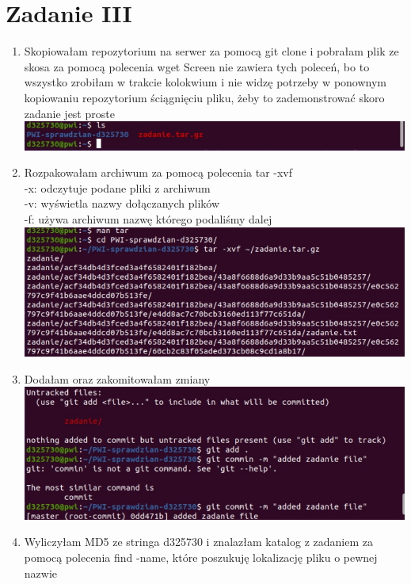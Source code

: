 \documentclass[12pt]{article}
\begin{document}
\section*{Zadanie III}
\begin{enumerate}
    \item Skopiowałam repozytorium na serwer za pomocą git clone i pobrałam plik ze skosa za pomocą polecenia wget
    Screen nie zawiera tych poleceń, bo to wszystko zrobiłam w trakcie kolokwium i nie widzę potrzeby w ponownym kopiowaniu repozytorium ściągnięciu pliku, żeby to zademonstrować skoro zadanie jest proste\\
    
    \includegraphics[scale = 0.9]{5.jpg}
    \newpage
    \item Rozpakowałam archiwum za pomocą polecenia tar -xvf \\
    -x: odczytuje podane pliki z archiwum\\
    -v: wyświetla nazwy dołączanych plików \\
    -f: używa archiwum nazwę którego podaliśmy dalej\\
    
    \includegraphics[scale = 0.9]{6.jpg}
    \item Dodałam oraz zakomitowałam zmiany\\
    
    \includegraphics[scale = 0.9]{7.jpg}
    \newpage
    \item Wyliczyłam  MD5 ze stringa d325730 i znalazłam katalog z zadaniem za pomocą polecenia find -name, które poszukuję lokalizację pliku o pewnej nazwie\\
    

\end{enumerate}
\end{document}
